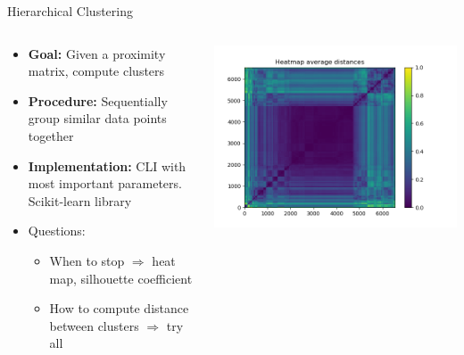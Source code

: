 \documentclass[shortpres]{beamer}
\begin{document}
\begin{frame}{Hierarchical Clustering}

\begin{columns}
\begin{column}{0.6\textwidth}
\begin{itemize}
\item \textbf{Goal:} Given a proximity matrix, compute clusters
\item \textbf{Procedure:} Sequentially group similar data points together
\item \textbf{Implementation:} CLI with most important parameters. Scikit-learn library
\item Questions:
\begin{itemize}
\item When to stop $\Rightarrow$ heat map, silhouette coefficient
\item How to compute distance between clusters $\Rightarrow$ try all
\end{itemize}
\end{itemize}
\end{column}
\begin{column}{0.4\textwidth}
\vspace{-1em}
\centering
\includegraphics[width=\textwidth]{heatmap2.png}
\vspace{-2em}
\end{column}
\end{columns}

\end{frame}
\end{document}
